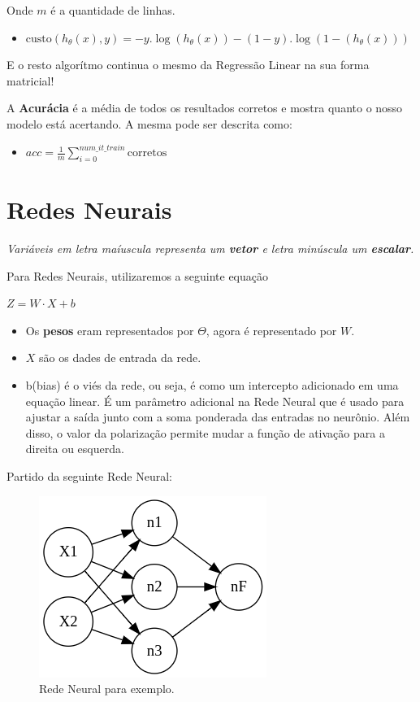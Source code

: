 \documentclass[12pt]{article}
\providecommand{\tightlist}{%
\setlength{\itemsep}{0pt}\setlength{\parskip}{0pt}}
\begin{document}
Onde \(m\) é a quantidade de linhas.

\begin{itemize}
\tightlist
\item
  \(\text{custo}(h_\theta(x),y)=-y.\log(h_\theta(x))-(1-y).\log(1-(h_\theta(x)))\)
\end{itemize}

E o resto algorítmo continua o mesmo da Regressão Linear na sua forma
matricial!

A \textbf{Acurácia} é a média de todos os resultados corretos e mostra
quanto o nosso modelo está acertando. A mesma pode ser descrita como:

\begin{itemize}
\tightlist
\item
  \(acc=\frac{1}{m}\sum\limits_{i=0}^{num\_it\_train}\text{corretos}\)
\end{itemize}

\hypertarget{redes-neurais}{%
\section{\texorpdfstring{\textbf{Redes
Neurais}}{Redes Neurais}}\label{redes-neurais}}

\emph{Variáveis em letra maíuscula representa um \textbf{vetor} e letra
minúscula um \textbf{escalar}.}

Para Redes Neurais, utilizaremos a seguinte equação

\(Z = W \cdot X + b\)

\begin{itemize}
\item
  Os \textbf{pesos} eram representados por \(\Theta\), agora é
  representado por \(W\).
\item
  \(X\) são os dades de entrada da rede.
\item
  b(bias) é o viés da rede, ou seja, é como um intercepto adicionado em
  uma equação linear. É um parâmetro adicional na Rede Neural que é
  usado para ajustar a saída junto com a soma ponderada das entradas no
  neurônio. Além disso, o valor da polarização permite mudar a função de
  ativação para a direita ou esquerda.
\end{itemize}

Partido da seguinte Rede Neural:

\begin{figure}
	\centering
	\includegraphics[width=.4\linewidth]{imgs/graphviz.png}
	\caption{Rede Neural para exemplo.}
\end{figure}
\end{document}
